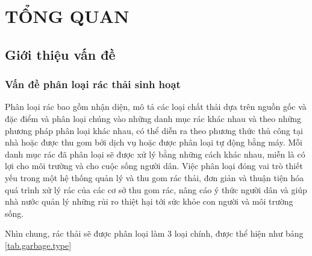 
\chapter{TỔNG QUAN}
\section{Giới thiệu vấn đề}
\subsection{Vấn đề phân loại rác thải sinh hoạt}
Phân loại rác bao gồm nhận diện, mô tả các loại chất thải dựa trên nguồn gốc và đặc điểm và phân loại chúng vào những danh mục rác khác nhau và theo những phương pháp phân loại khác nhau, có thể diễn ra theo phương thức thủ công tại nhà hoặc được thu gom bởi dịch vụ hoặc được phân loại tự động bằng máy. Mỗi danh mục rác đã phân loại sẽ được xử lý bằng những cách khác nhau, miễn là có lợi cho môi trường và cho cuộc sống người dân. Việc phân loại đóng vai trò thiết yếu trong một hệ thống quản lý và thu gom rác thải, đơn giản và thuận tiện hóa quá trình xử lý rác của các cơ sở thu gom rác, nâng cáo ý thức người dân và giúp nhà nước quản lý những rủi ro thiệt hại tới sức khỏe con người và môi trường sống.

Nhìn chung, rác thải sẽ được phân loại làm 3 loại chính, được thể hiện như bảng \ref{tab.garbage.type}

